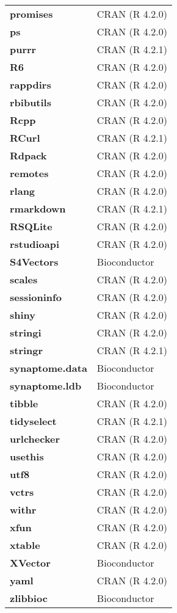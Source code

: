 \documentclass[
]{article}
\begin{document}
\begin{longtable}[]{@{}
  >{\centering\arraybackslash}p{}
  >{\centering\arraybackslash}p{}@{}}
\textbf{promises} & CRAN (R 4.2.0) \\
\textbf{ps} & CRAN (R 4.2.0) \\
\textbf{purrr} & CRAN (R 4.2.1) \\
\textbf{R6} & CRAN (R 4.2.0) \\
\textbf{rappdirs} & CRAN (R 4.2.0) \\
\textbf{rbibutils} & CRAN (R 4.2.0) \\
\textbf{Rcpp} & CRAN (R 4.2.0) \\
\textbf{RCurl} & CRAN (R 4.2.1) \\
\textbf{Rdpack} & CRAN (R 4.2.0) \\
\textbf{remotes} & CRAN (R 4.2.0) \\
\textbf{rlang} & CRAN (R 4.2.0) \\
\textbf{rmarkdown} & CRAN (R 4.2.1) \\
\textbf{RSQLite} & CRAN (R 4.2.0) \\
\textbf{rstudioapi} & CRAN (R 4.2.0) \\
\textbf{S4Vectors} & Bioconductor \\
\textbf{scales} & CRAN (R 4.2.0) \\
\textbf{sessioninfo} & CRAN (R 4.2.0) \\
\textbf{shiny} & CRAN (R 4.2.0) \\
\textbf{stringi} & CRAN (R 4.2.0) \\
\textbf{stringr} & CRAN (R 4.2.1) \\
\textbf{synaptome.data} & Bioconductor \\
\textbf{synaptome.ldb} & Bioconductor \\
\textbf{tibble} & CRAN (R 4.2.0) \\
\textbf{tidyselect} & CRAN (R 4.2.1) \\
\textbf{urlchecker} & CRAN (R 4.2.0) \\
\textbf{usethis} & CRAN (R 4.2.0) \\
\textbf{utf8} & CRAN (R 4.2.0) \\
\textbf{vctrs} & CRAN (R 4.2.0) \\
\textbf{withr} & CRAN (R 4.2.0) \\
\textbf{xfun} & CRAN (R 4.2.0) \\
\textbf{xtable} & CRAN (R 4.2.0) \\
\textbf{XVector} & Bioconductor \\
\textbf{yaml} & CRAN (R 4.2.0) \\
\textbf{zlibbioc} & Bioconductor \\
\bottomrule()
\end{longtable}
\end{document}
